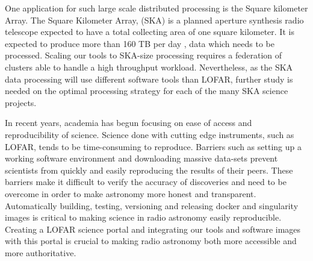One application for such large scale distributed processing is the Square kilometer Array. The Square Kilometer Array, (SKA) is a planned aperture synthesis radio telescope expected to have a total collecting area of one square kilometer. It is expected to produce more than 160 TB per day \citep{johnston2017taming}, data which needs to be processed. Scaling our tools to SKA-size processing requires a federation of clusters able to handle a high throughput workload. Nevertheless, as the SKA data processing will use different software tools than LOFAR, further study is needed on the optimal processing strategy for each of the many SKA science projects.

In recent years, academia has begun focusing on ease of access and reproducibility of science. Science done with cutting edge instruments, such as LOFAR, tends to be time-consuming to reproduce. Barriers such as setting up a working software environment and downloading massive data-sets prevent scientists from quickly and easily reproducing the results of their peers. These barriers make it difficult to verify the accuracy of discoveries and need to be overcome in order to make astronomy more honest and transparent. Automatically building, testing, versioning and releasing docker and singularity images is critical to making science in radio astronomy easily reproducible. Creating a LOFAR science portal and integrating our tools and software images with this portal is crucial to making radio astronomy both more accessible and more authoritative.
